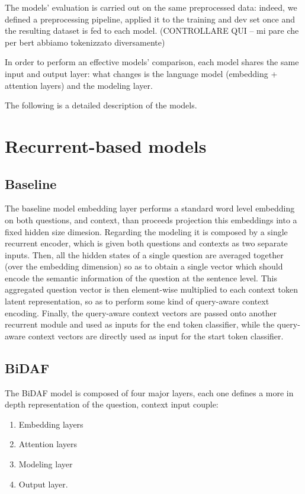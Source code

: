 \documentclass[a4paper,10pt]{report}
\begin{document}
The models’ evaluation is carried out on the same preprocessed data: indeed, we defined a preprocessing pipeline, applied it to the training and dev set once and the resulting dataset is fed to each model. (CONTROLLARE QUI – mi pare che per bert abbiamo tokenizzato diversamente)

In order to perform an effective models’ comparison, each model shares the same input and output layer: what changes is the language model (embedding + attention layers) and the modeling layer.

The following is a detailed description of the models.

\section{Recurrent-based models}\label{sec:recurrent-models}
\subsection{Baseline}\label{subsec:baseline}

The baseline model embedding layer performs a standard word level embedding on both questions, and context, than proceeds projection this embeddings into a fixed hidden size dimesion.
Regarding the modeling it is composed by a single recurrent encoder, which is given both questions and contexts as two separate inputs. Then, all the hidden states of a single question are averaged together (over the embedding dimension) so as to obtain a single vector which should encode the semantic information of the question at the sentence level. This aggregated question vector is then element-wise multiplied to each context token latent representation, so as to perform some kind of query-aware context encoding. Finally, the query-aware context vectors are passed onto another recurrent module and used as inputs for the end token classifier, while the query-aware context vectors are directly used as input for the start token classifier.

\subsection{BiDAF}\label{subsec:bidaf}

The BiDAF model is composed of four major layers, each one defines a more in depth representation of the question, context input couple:
\begin{enumerate}
  \item Embedding layers
  \item Attention layers
  \item Modeling layer
  \item Output layer.
\end{enumerate}
\end{document}
